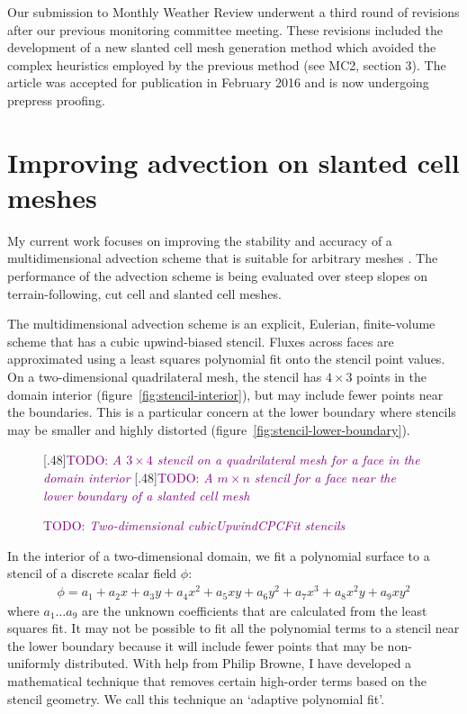 \documentclass[a4paper,11pt]{article}
\newcommand{\TODO}[1]{\textcolor{purple}{TODO: \emph{#1}}}
\begin{document}
Our submission to Monthly Weather Review underwent a third round of revisions after our previous monitoring committee meeting.  These revisions included the development of a new slanted cell mesh generation method which avoided the complex heuristics employed by the previous method (see MC2, section 3).  The article was accepted for publication in February 2016 and is now undergoing prepress proofing.

\section{Improving advection on slanted cell meshes}
My current work focuses on improving the stability and accuracy of a multidimensional advection scheme that is suitable for arbitrary meshes \citep{weller-shahrokhi2014}.  The performance of the advection scheme is being evaluated over steep slopes on terrain-following, cut cell and slanted cell meshes.

The multidimensional advection scheme is an explicit, Eulerian, finite-volume scheme that has a cubic upwind-biased stencil.  Fluxes across faces are approximated using a least squares polynomial fit onto the stencil point values.
On a two-dimensional quadrilateral mesh, the stencil has $4 \times 3$ points in the domain interior (figure~\ref{fig:stencil-interior}), but may include fewer points near the boundaries.  This is a particular concern at the lower boundary where stencils may be smaller and highly distorted (figure~\ref{fig:stencil-lower-boundary}).

\begin{figure}
	\centering
	[.48\linewidth]{\TODO{A $3 \times 4$ stencil on a quadrilateral mesh for a face in the domain interior}}
	[.48\linewidth]{\TODO{A $m \times n$ stencil for a face near the lower boundary of a slanted cell mesh}}
	\caption{\TODO{Two-dimensional cubicUpwindCPCFit stencils}}
	\label{fig:stencils}
\end{figure}

In the interior of a two-dimensional domain, we fit a polynomial surface to a stencil of a discrete scalar field $\phi$:
\begin{align}
	\phi = a_1 + a_2 x + a_3 y + a_4 x^2 + a_5 x y + a_6 y^2 + a_7 x^3 + a_8 x^2 y + a_9 x y^2
\end{align}
where $a_1 \ldots a_9$ are the unknown coefficients that are calculated from the least squares fit.  It may not be possible to fit all the polynomial terms to a stencil near the lower boundary because it will include fewer points that may be non-uniformly distributed.  With help from Philip Browne, I have developed a mathematical technique that removes certain high-order terms based on the stencil geometry.  We call this technique an `adaptive polynomial fit'.
\end{document}

